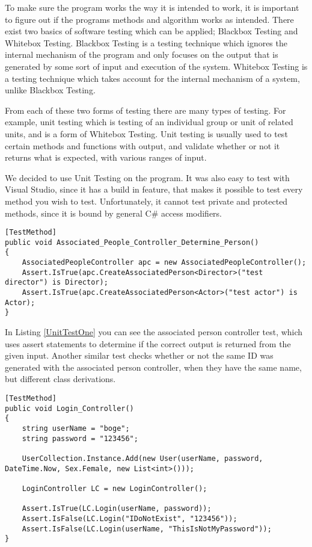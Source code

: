 To make sure the program works the way it is intended to work, it is important to figure out if the programs methods and algorithm works as intended. There exist two basics of software testing which can be applied; Blackbox Testing and Whitebox Testing. Blackbox Testing is a testing technique which ignores the internal mechanism of the program and only focuses on the output that is generated by some sort of input and execution of the system. Whitebox Testing is a testing technique which takes account for the internal mechanism of a system, unlike Blackbox Testing.

From each of these two forms of testing there are many types of testing. For example, unit testing which is testing of an individual group or unit of related units, and is a form of Whitebox Testing. Unit testing is usually used to test certain methods and functions with output, and validate whether or not it returns what is expected, with various ranges of input. \cite{Testing}

We decided to use Unit Testing on the program. It was also easy to test with Visual Studio, since it has a build in feature, that makes it possible to test every method you wish to test. Unfortunately, it cannot test private and protected methods, since it is bound by general C\# access modifiers.

\begin{lstlisting}[caption={A unit test which tests the associated person controller},label={UnitTestOne}]
[TestMethod]
public void Associated_People_Controller_Determine_Person()
{
	AssociatedPeopleController apc = new AssociatedPeopleController();
	Assert.IsTrue(apc.CreateAssociatedPerson<Director>("test director") is Director);
	Assert.IsTrue(apc.CreateAssociatedPerson<Actor>("test actor") is Actor);
}
\end{lstlisting}

In Listing \ref{UnitTestOne} you can see the associated person controller test, which uses assert statements to determine if the correct output is returned from the given input. Another similar test checks whether or not the same ID was generated with the associated person controller, when they have the same name, but different class derivations.

\begin{lstlisting}[caption={A unit test which tests the login controller},label={UnitTestTwo}]
[TestMethod] 
public void Login_Controller()
{
	string userName = "boge";
	string password = "123456";

	UserCollection.Instance.Add(new User(userName, password, DateTime.Now, Sex.Female, new List<int>()));

	LoginController LC = new LoginController();

	Assert.IsTrue(LC.Login(userName, password));
	Assert.IsFalse(LC.Login("IDoNotExist", "123456"));
	Assert.IsFalse(LC.Login(userName, "ThisIsNotMyPassword"));
}
\end{lstlisting}


